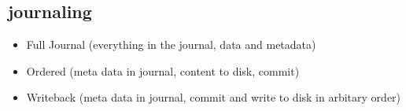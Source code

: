 \documentclass[11pt,twoside,landscape]{article}
\begin{document}
\begin{multicols}{3}
\subsection*{journaling}
\begin{itemize}
\item Full Journal (everything in the journal, data and metadata)
\item Ordered (meta data in journal, content to disk, commit)
\item Writeback (meta data in journal, commit and write to disk in arbitary order)
\end{itemize}

\end{multicols}
\end{document}
